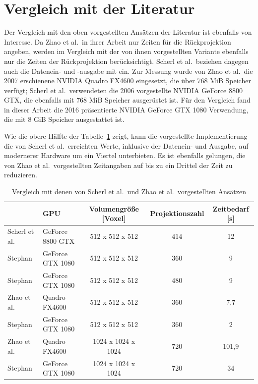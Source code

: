 \section{Vergleich mit der Literatur}

Der Vergleich mit den oben vorgestellten Ansätzen der Literatur ist ebenfalls von Interesse. Da Zhao et al.\ in ihrer
Arbeit nur Zeiten für die Rückprojektion angeben, werden im Vergleich mit der von ihnen vorgestellten Variante ebenfalls
nur die Zeiten der Rückprojektion berücksichtigt. Scherl et al.\ beziehen dagegen auch die Datenein- und -ausgabe mit
ein. Zur Messung wurde von Zhao et al.\ die 2007 erschienene NVIDIA Quadro FX4600 eingesetzt, die über 768 MiB Speicher
verfügt; Scherl et al.\ verwendeten die 2006 vorgestellte NVIDIA GeForce 8800 GTX, die ebenfalls mit 768 MiB Speicher
ausgerüstet ist. Für den Vergleich fand in dieser Arbeit die 2016 präsentierte NVIDIA GeForce GTX 1080 Verwendung, die
mit 8 GiB Speicher ausgestattet ist.

Wie die obere Hälfte der Tabelle~\ref{table:paris_vs_scherl_zhao} zeigt, kann die vorgestellte Implementierung die von
Scherl et al.\ erreichten Werte, inklusive der Datenein- und Ausgabe, auf modernerer Hardware um ein Viertel
unterbieten. Es ist ebenfalls gelungen, die von Zhao et al.\ vorgestellten Zeitangaben auf bis zu ein Drittel der Zeit
zu reduzieren.

\begin{table}
    \centering
    \begin{tabular}{llccc}
        \hline
        & GPU & Volumengröße [Voxel] & Projektionszahl & Zeitbedarf [s]\\
        \hline
        Scherl et al. & GeForce 8800 GTX & 512 x 512 x 512 & 414 & 12\\
        Stephan & GeForce GTX 1080 & 512 x 512 x 512 & 360 & 9\\
        Stephan & GeForce GTX 1080 & 512 x 512 x 512 & 480 & 9\\
        \hline
        Zhao et al. & Quadro FX4600 & 512 x 512 x 512 & 360 & 7,7\\
        Stephan & GeForce GTX 1080 & 512 x 512 x 512 & 360 & 2\\
        Zhao et al. & Quadro FX4600 & 1024 x 1024 x 1024 & 720 & 101,9\\
        Stephan & GeForce GTX 1080 & 1024 x 1024 x 1024 & 720 & 34\\
        \hline
    \end{tabular}
    \caption{Vergleich mit denen von Scherl et al.\ und Zhao et al.\ vorgestellten Ansätzen}
    \label{table:paris_vs_scherl_zhao}
\end{table}
